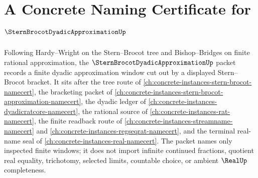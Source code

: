 \chapter{A Concrete Naming Certificate for $\SternBrocotDyadicApproximationUp$}
\label{ch:concrete-instances-stern-brocot-dyadic-approximation-namecert}

Following Hardy--Wright on the Stern--Brocot tree and Bishop--Bridges on finite rational approximation, the $\SternBrocotDyadicApproximationUp$ packet records a finite dyadic approximation window cut out by a displayed Stern--Brocot bracket. It sits after the tree route of \autoref{ch:concrete-instances-stern-brocot-namecert}, the bracketing packet of \autoref{ch:concrete-instances-stern-brocot-approximation-namecert}, the dyadic ledger of \autoref{ch:concrete-instances-dyadicratcore-namecert}, the rational source of \autoref{ch:concrete-instances-rat-namecert}, the finite readback route of \autoref{ch:concrete-instances-streamname-namecert} and \autoref{ch:concrete-instances-regseqrat-namecert}, and the terminal real-name seal of \autoref{ch:concrete-instances-real-namecert}. The packet names only inspected finite windows; it does not import infinite continued fractions, quotient real equality, trichotomy, selected limits, countable choice, or ambient $\RealUp$ completeness.

